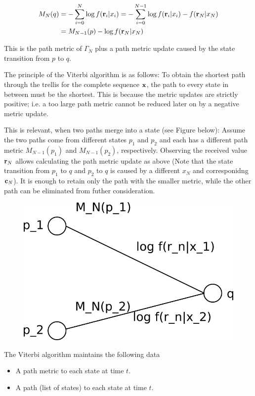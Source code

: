 \begin{align*}
M_N(q) & = - \sum_{i=0}^{N} \log f(\mathbf{r}_i|x_i) = - \sum_{i=0}^{N-1} \log f(\mathbf{r}_i|x_i) - f(\mathbf{r}_N|x_N) \\ &= M_{N-1}(p) - \log f(\mathbf{r}_N|x_N)
\end{align*}

This is the path metric of $\Gamma_N$ plus a path metric update caused by the state transition from $p$ to $q$.

The principle of the Viterbi algorithm is as follows: To obtain the shortest path through the trellis for the complete sequence $\mathbf{x}$, the path to every state in between must be the shortest. This is because the metric updates are strictly positive; i.e. a too large path metric cannot be reduced later on by a negative metric update.

This is relevant, when two paths merge into a state (see Figure below): Assume the two paths come from different states $p_1$ and $p_2$ and each has a different path metric $M_{N-1}(p_1)$ and $M_{N-1}(p_2)$, respectively. Observing the received value $\mathbf{r}_N$ allows calculating the path metric update as above (Note that the state transition from $p_1$ to $q$ and $p_2$ to $q$ is caused by a different $x_N$ and corresponidng $\mathbf{c}_N$). It is enough to retain only the path with the smaller metric, while the other path can be eliminated from futher consideration.


\begin{figure}[ht]
  \includegraphics[scale=1.0]{images/convcodes_1_3.png}
\end{figure}

The Viterbi algorithm maintains the following data

\begin{itemize}

	\item A path metric to each state at time $t$.

	\item A path (list of states) to each state at time $t$.

\end{itemize}

